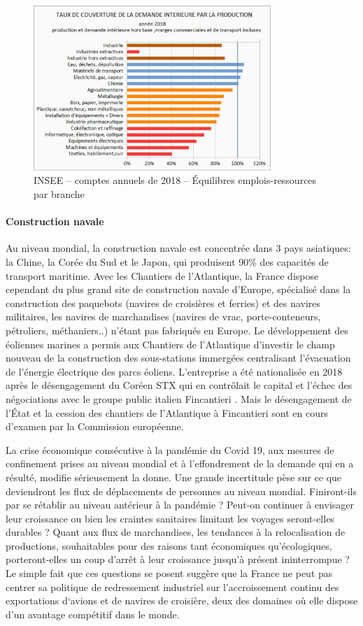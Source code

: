 \documentclass[a4paper]{article}
\begin{document}
\begin{figure}[H]
    \centering
    \includegraphics*[width=0.8\textwidth]{images/couverture}
    \caption{INSEE – comptes annuels de 2018 – Équilibres emplois-ressources par branche}
    \label{fig:couverture}
\end{figure}

\paragraph{Construction navale}
Au niveau mondial, la construction navale est concentrée dans 3 pays asiatiques: la Chine, la Corée du Sud et le Japon, qui produisent 90\% des capacités de transport maritime. Avec les Chantiers de l’Atlantique, la France dispose cependant du plus grand site de construction navale d’Europe, spécialisé dans la construction des paquebots (navires de croisières et ferries) et des navires militaires, les navires de marchandises (navires de vrac, porte-conteneurs, pétroliers, méthaniers..) n’étant pas fabriqués en Europe. Le développement des éoliennes marines a permis aux Chantiers de l’Atlantique d’investir le champ nouveau de la construction des sous-stations immergées centralisant l’évacuation de l’énergie électrique des parcs éoliens. L’entreprise a été nationalisée en 2018 après le désengagement du Coréen STX qui en contrôlait le capital et l’échec des négociations avec le groupe public italien Fincantieri . Mais le désengagement de l’État et la cession des chantiers de l’Atlantique à Fincantieri sont en cours d’examen par la Commission européenne.

La crise économique consécutive à la pandémie du Covid 19, aux mesures de confinement prises au niveau mondial et à l’effondrement de la demande qui en a résulté, modifie sérieusement la donne. Une grande incertitude pèse sur ce que deviendront les flux de déplacements de personnes au niveau mondial. Finiront-ils par se rétablir au niveau antérieur à la pandémie ? Peut-on continuer à envisager leur croissance ou bien les craintes sanitaires limitant les voyages seront-elles durables ?  Quant aux flux de marchandises, les tendances à la relocalisation de productions, souhaitables pour des raisons tant économiques qu’écologiques, porteront-elles un coup d’arrêt à leur croissance jusqu’à présent ininterrompue ? Le simple fait que ces questions se posent suggère que la France ne peut pas  centrer sa politique de redressement industriel sur l’accroissement continu des exportations d‘avions et de navires de croisière, deux des domaines où elle dispose d’un avantage compétitif dans le monde.
\end{document}
